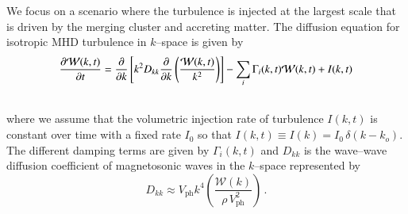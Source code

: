 \documentclass[a4paper,fleqn,usenatbib]{mnras}
\newcommand{\Vph}{V_\mathrm{ph}}
\begin{document}
We focus on a scenario where the turbulence is injected at the largest
scale that is driven by the merging cluster and accreting matter. The
diffusion equation for isotropic MHD turbulence in $k$--space is given
by
\begin{eqnarray}
&{{\partial {\mathcal W}(k,t) }\over{\partial t}}
=
{{\partial}\over{\partial k}}
\left[
k^2 D_{kk}
{{\partial}\over{\partial k}}
\left( {{ {\mathcal W}(k,t) }\over{k^2}} \right)
\right]
- \sum_i \Gamma_i (k,t) {\mathcal W}(k,t)
+ I(k,t)\nonumber\\
&
\label{modes_kinetic}
\end{eqnarray}
where we assume that the volumetric injection rate of turbulence
$I(k,t)$ is constant over time with a fixed rate $I_0$ so that $I(k,t)
\equiv I(k) = I_0\,\delta (k - k_o)$. The different damping terms are
given by $\Gamma_i(k,t)$ and $D_{kk}$ is the wave--wave diffusion
coefficient of magnetosonic waves in the $k$--space represented by
\begin{equation}
  \label{eq:Dkk}
  D_{kk} \approx \Vph k^4
  \left(\frac{\mathcal{W}(k)}{\rho\,\Vph^2}\right)\,.
\end{equation}
\end{document}
